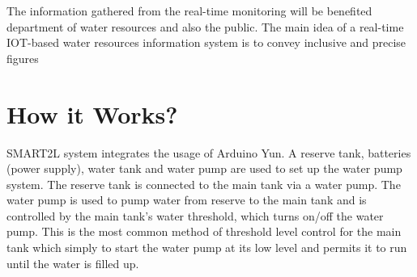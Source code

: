 \documentclass[12pt,times,a4paper]{report}
\begin{document}
{{\begin{normalsize}
\newpage
The information gathered from the real-time monitoring will be benefited department of water resources and also the public. The main idea of a real-time IOT-based water resources information system is to convey inclusive and precise figures
\begin{figure}
\begin{center}
\caption{}
\end{center}
\end{figure}
\pagebreak
\section{How it Works?}
\par
SMART2L system integrates the usage of Arduino Yun. A reserve tank, batteries (power supply), water tank and water pump are used to set up the water pump system. The reserve tank is connected to the main tank via a water pump. The water pump is used to pump water from reserve to the main tank and is controlled by the main tank’s water threshold, which turns on/off the water pump. This is the most common method of threshold level control for the main tank which simply to start the water pump at its low level and permits it to run until the water is filled up.

\begin{figure}
\begin{center}
\caption{}
\end{center}
\end{figure}


\end{normalsize}}}
\end{document}
